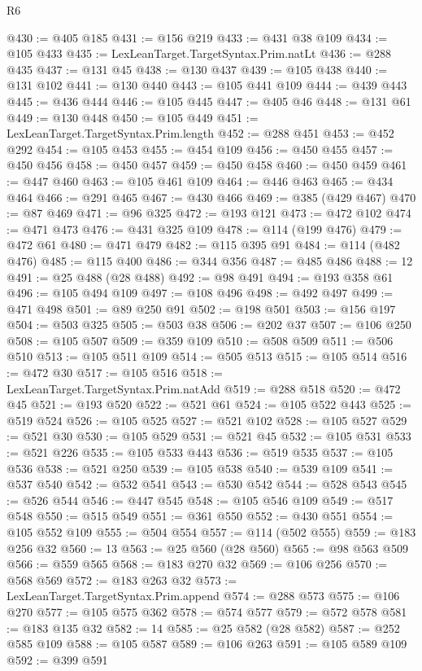 \begin{lexlean}{R6}
\begin{coremodule}
@430 := @405 @185
@431 := @156 @219
@433 := @431 @38 @109
@434 := @105 @433
@435 := LexLeanTarget.TargetSyntax.Prim.natLt
@436 := @288 @435
@437 := @131 @45
@438 := @130 @437
@439 := @105 @438
@440 := @131 @102
@441 := @130 @440
@443 := @105 @441 @109
@444 := @439 @443
@445 := @436 @444
@446 := @105 @445
@447 := @405 @46
@448 := @131 @61
@449 := @130 @448
@450 := @105 @449
@451 := LexLeanTarget.TargetSyntax.Prim.length
@452 := @288 @451
@453 := @452 @292
@454 := @105 @453
@455 := @454 @109
@456 := @450 @455
@457 := @450 @456
@458 := @450 @457
@459 := @450 @458
@460 := @450 @459
@461 := @447 @460
@463 := @105 @461 @109
@464 := @446 @463
@465 := @434 @464
@466 := @291 @465
@467 := @430 @466
@469 := @385 (@429 @467)
@470 := @87 @469
@471 := @96 @325
@472 := @193 @121
@473 := @472 @102
@474 := @471 @473
@476 := @431 @325 @109
@478 := @114 (@199 @476)
@479 := @472 @61
@480 := @471 @479
@482 := @115 @395 @91
@484 := @114 (@482 @476)
@485 := @115 @400
@486 := @344 @356
@487 := @485 @486
@488 := 12
@491 := @25 @488 (@28 @488)
@492 := @98 @491
@494 := @193 @358 @61
@496 := @105 @494 @109
@497 := @108 @496
@498 := @492 @497
@499 := @471 @498
@501 := @89 @250 @91
@502 := @198 @501
@503 := @156 @197
@504 := @503 @325
@505 := @503 @38
@506 := @202 @37
@507 := @106 @250
@508 := @105 @507
@509 := @359 @109
@510 := @508 @509
@511 := @506 @510
@513 := @105 @511 @109
@514 := @505 @513
@515 := @105 @514
@516 := @472 @30
@517 := @105 @516
@518 := LexLeanTarget.TargetSyntax.Prim.natAdd
@519 := @288 @518
@520 := @472 @45
@521 := @193 @520
@522 := @521 @61
@524 := @105 @522 @443
@525 := @519 @524
@526 := @105 @525
@527 := @521 @102
@528 := @105 @527
@529 := @521 @30
@530 := @105 @529
@531 := @521 @45
@532 := @105 @531
@533 := @521 @226
@535 := @105 @533 @443
@536 := @519 @535
@537 := @105 @536
@538 := @521 @250
@539 := @105 @538
@540 := @539 @109
@541 := @537 @540
@542 := @532 @541
@543 := @530 @542
@544 := @528 @543
@545 := @526 @544
@546 := @447 @545
@548 := @105 @546 @109
@549 := @517 @548
@550 := @515 @549
@551 := @361 @550
@552 := @430 @551
@554 := @105 @552 @109
@555 := @504 @554
@557 := @114 (@502 @555)
@559 := @183 @256 @32
@560 := 13
@563 := @25 @560 (@28 @560)
@565 := @98 @563 @509
@566 := @559 @565
@568 := @183 @270 @32
@569 := @106 @256
@570 := @568 @569
@572 := @183 @263 @32
@573 := LexLeanTarget.TargetSyntax.Prim.append
@574 := @288 @573
@575 := @106 @270
@577 := @105 @575 @362
@578 := @574 @577
@579 := @572 @578
@581 := @183 @135 @32
@582 := 14
@585 := @25 @582 (@28 @582)
@587 := @252 @585 @109
@588 := @105 @587
@589 := @106 @263
@591 := @105 @589 @109
@592 := @399 @591

\end{coremodule}
\end{lexlean}
